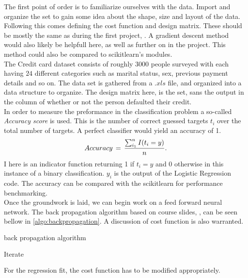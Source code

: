 \documentclass[12pt, a4paper]{scrartcl}
\begin{document}
    The first point of order is to familiarize ourselves with the data. Import and organize the 
set to gain some idea about the shape, size and layout of the data. Following this comes defining 
the cost function and design matrix.  These should be mostly the same as during the first 
project, \cite{project1}. A gradient descent method would also likely be helpfull here, as well 
as further on in the project. This method could also be compared to scikitlearn's modules. \\

    The Credit card dataset consists of roughly $3 000$ people surveyed with each having $24$ 
different categories such as marital status, sex, previous payment details and so on. The data set
is gathered from a $.xls$ file, and organized into a \cite{pandas} data structure to organize. 
The design matrix here, is the set, sans the output in the column of whether or not the person defaulted
their credit. \\

    In order to measure the preformance in the classification problem a so-called 
\textit{Accuracy score} is used. This is the number of correct guessed targets $t_i$ over the 
total number of targets. A perfect classifier would yield an accuracy of 1.  
\begin{align} 
    Accuracy \,=\, \frac{ \sum_{i_1}^n I\qty( t_i = y ) }{ n }.
\label{eq:accuracy}
\end{align}
I here is an indicator function returning 1 if $t_i = y$ and 0 otherwise in this instance of a 
binary classification. $y_i$ is the output of the Logistic Regression code. The accuracy can be 
compared with the scikitlearn for performance benchmarking. \\ 

    Once the groundwork is laid, we can begin work on a feed forward neural network. The back 
propagation algorithm based on course slides, \cite{slides}, can be seen bellow in 
\ref{algo:backpropagation}. A discussion of cost function is also warranted. \\ 
\begin{algorithm}
\caption{back propagation algorithm}
\begin{algorithmic}
\STATE Iterate
\ENDFOR
\end{algorithmic}
\label{algo:backpropagation}
\end{algorithm}

    For the regression fit, the cost function has to be modified appropriately.\\
    
\end{document}
